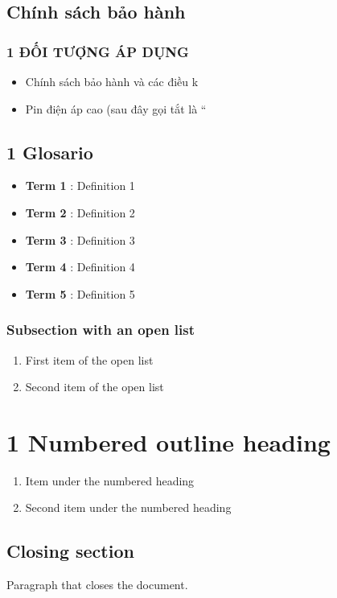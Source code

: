 \documentclass[11pt,a4paper]{article}
\begin{document}
\subsection{Chính sách bảo hành}

\subsubsection{1 ĐỐI TƯỢNG ÁP DỤNG}

\begin{itemize}
\item Chính sách bảo hành và các điều k
\item Pin điện áp cao (sau đây gọi tắt là “
\end{itemize}

\subsection{1 Glosario}

\begin{itemize}
\item \textbf{Term 1} : Definition 1
\item \textbf{Term 2} : Definition 2
\item \textbf{Term 3} : Definition 3
\item \textbf{Term 4} : Definition 4
\item \textbf{Term 5} : Definition 5
\end{itemize}

\subsubsection{Subsection with an open list}

\begin{enumerate}
\item First item of the open list
\item Second item of the open list
\end{enumerate}

\section{1 Numbered outline heading}

\begin{enumerate}
\item Item under the numbered heading
\item Second item under the numbered heading
\end{enumerate}

\subsection{Closing section}

Paragraph that closes the document.
\end{document}
